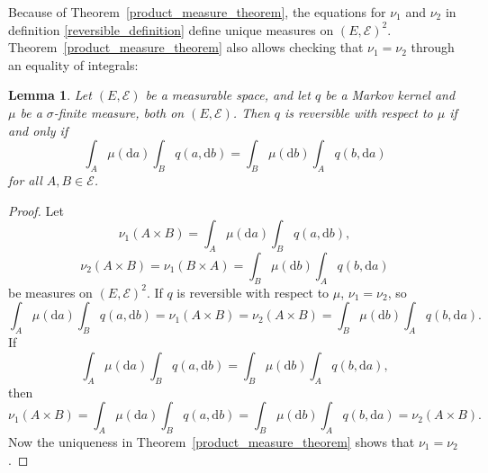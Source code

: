 \documentclass[english,twoside,openright]{HYgraduMLDS}
\newtheorem{lemma}{Lemma}[chapter]
\newcommand{\dx}{\mathrm{d}}
\begin{document}
Because of Theorem~\ref{product_measure_theorem}, the equations for
\(\nu_{1}\) and \(\nu_{2}\) in definition \ref{reversible_definition} define
unique measures on \((E, \mathcal{E})^{2}\). Theorem~\ref{product_measure_theorem}
also allows checking that \(\nu_{1} = \nu_{2}\) through an equality of
integrals:
\begin{lemma}\label{reversible_check_lemma}
	Let \((E, \mathcal{E})\) be a measurable space, and let \(q\) be a Markov
  kernel and \(\mu\) be a \(\sigma\)-finite measure, both on \((E, \mathcal{E})\).
  Then \(q\) is reversible with respect to \(\mu\) if and only if
  \[
    \int_{A}\mu(\dx a)\int_{B}q(a, \dx b)
    = \int_{B}\mu(\dx b)\int_{A}q(b, \dx a)
  \]
  for all \(A, B\in \mathcal{E}\).
\end{lemma}
\begin{proof}
  Let
  \[
    \nu_{1}(A\times B) = \int_{A}\mu(\dx a)\int_{B}q(a, \dx b),
  \]
  \[
    \nu_{2}(A\times B) = \nu_{1}(B\times A) = \int_{B}\mu(\dx b)\int_{A}q(b, \dx a)
  \]
  be measures on \((E, \mathcal{E})^{2}\). If \(q\) is reversible with respect to
  \(\mu\), \(\nu_{1} = \nu_{2}\), so
  \[
    \int_{A}\mu(\dx a)\int_{B}q(a, \dx b) = \nu_{1}(A\times B) = \nu_{2}(A\times B)
    = \int_{B}\mu(\dx b)\int_{A}q(b, \dx a).
  \]
  If
  \[
    \int_{A}\mu(\dx a)\int_{B}q(a, \dx b)
    = \int_{B}\mu(\dx b)\int_{A}q(b, \dx a),
  \]
  then
  \[
    \nu_{1}(A\times B) = \int_{A}\mu(\dx a)\int_{B}q(a, \dx b)
    = \int_{B}\mu(\dx b)\int_{A}q(b, \dx a) = \nu_{2}(A\times B).
  \]
  Now the uniqueness in Theorem~\ref{product_measure_theorem} shows that
  \(\nu_{1} = \nu_{2}\).
\end{proof}
\end{document}
